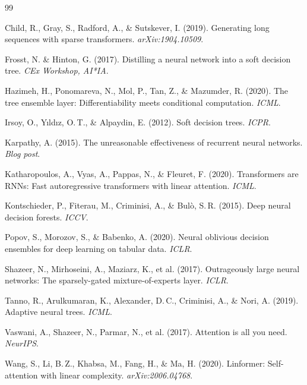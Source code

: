 \documentclass[11pt,a4paper]{article}
\begin{document}

\begin{thebibliography}{99}

Child, R., Gray, S., Radford, A., \& Sutskever, I. (2019).
Generating long sequences with sparse transformers.
\textit{arXiv:1904.10509}.

Frosst, N. \& Hinton, G. (2017).
Distilling a neural network into a soft decision tree.
\textit{CEx Workshop, AI*IA}.

Hazimeh, H., Ponomareva, N., Mol, P., Tan, Z., \& Mazumder, R. (2020).
The tree ensemble layer: Differentiability meets conditional computation.
\textit{ICML}.

Irsoy, O., Y{\i}ld{\i}z, O.\,T., \& Alpaydin, E. (2012).
Soft decision trees.
\textit{ICPR}.

Karpathy, A. (2015).
The unreasonable effectiveness of recurrent neural networks.
\textit{Blog post}.

Katharopoulos, A., Vyas, A., Pappas, N., \& Fleuret, F. (2020).
Transformers are RNNs: Fast autoregressive transformers with linear attention.
\textit{ICML}.

Kontschieder, P., Fiterau, M., Criminisi, A., \& Bul\`{o}, S.\,R. (2015).
Deep neural decision forests.
\textit{ICCV}.

Popov, S., Morozov, S., \& Babenko, A. (2020).
Neural oblivious decision ensembles for deep learning on tabular data.
\textit{ICLR}.

Shazeer, N., Mirhoseini, A., Maziarz, K., et al. (2017).
Outrageously large neural networks: The sparsely-gated mixture-of-experts layer.
\textit{ICLR}.

Tanno, R., Arulkumaran, K., Alexander, D.\,C., Criminisi, A., \& Nori, A. (2019).
Adaptive neural trees.
\textit{ICML}.

Vaswani, A., Shazeer, N., Parmar, N., et al. (2017).
Attention is all you need.
\textit{NeurIPS}.

Wang, S., Li, B.\,Z., Khabsa, M., Fang, H., \& Ma, H. (2020).
Linformer: Self-attention with linear complexity.
\textit{arXiv:2006.04768}.

\end{thebibliography}
\end{document}

